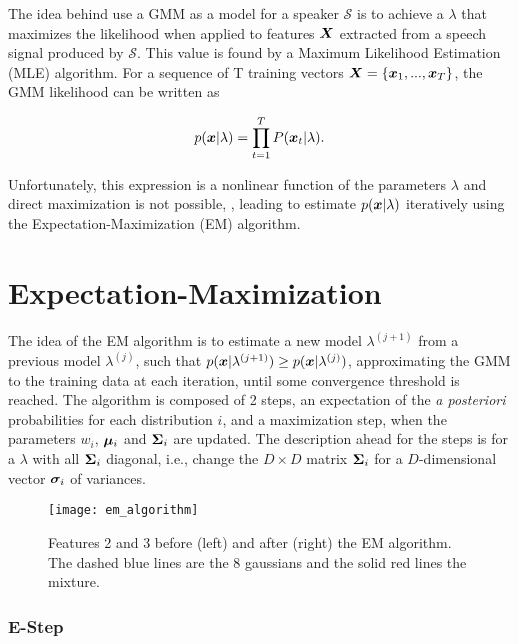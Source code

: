 The idea behind use a GMM as a model for a speaker $\mathcal{S}$ is to achieve a $\lambda$ that maximizes the likelihood when applied to features $\boldsymbol{X}$ extracted from a speech signal produced by $\mathcal{S}$. This value is found by a Maximum Likelihood Estimation (MLE) algorithm. For a sequence of T training vectors $\boldsymbol{X} = \{\boldsymbol{x}_1, ..., \boldsymbol{x}_T\}$, the GMM likelihood can be written as

\begin{equation}
    \postpdf{\dvec{x}}{\lambda} = \prod_{t=1}^T \postprob{\dvec{x}_t}{\lambda}.
    \label{eq:likelihood_gmm_mle}
\end{equation}

\noindent Unfortunately, this expression is a nonlinear function of the parameters $\lambda$ and direct maximization is not possible, , leading to estimate $p(\boldsymbol{x}|\lambda)$ iteratively using the Expectation-Maximization (EM) algorithm.

\section{Expectation-Maximization}

The idea of the EM algorithm is to estimate a new model $\lambda^{(j+1)}$ from a previous model $\lambda^{(j)}$, such that $p(\boldsymbol{x}|\lambda^{(j+1)}) \geq p(\boldsymbol{x}|\lambda^{(j)})$, approximating the GMM to the training data at each iteration, until some convergence threshold is reached. The algorithm is composed of 2 steps, an expectation of the \emph{a posteriori} probabilities for each distribution $i$, and a maximization step, when the parameters $w_i$, $\boldsymbol{\mu}_i$ and $\boldsymbol{\Sigma}_i$ are updated. The description ahead for the steps is for a $\lambda$ with all $\boldsymbol{\Sigma}_i$ diagonal, i.e., change the $D \times D$ matrix $\boldsymbol{\Sigma}_i$ for a $D$-dimensional vector $\boldsymbol{\sigma}_i$ of variances.

\begin{figure}[ht]
    \centering
    \texttt{[image: em\_algorithm]}
    \caption{Features 2 and 3 before (left) and after (right) the EM algorithm. The dashed blue lines are the 8 gaussians and the solid red lines the mixture.}
    \label{fig:em_algorithm}
\end{figure}

\subsubsection*{E-Step}

